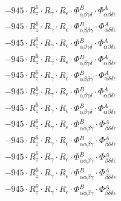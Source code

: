 \documentclass{article}
\begin{document}
\begin{subequations}
\begin{gather}
\begin{array}{c}
 \\[0.2em] 		 - 945 \cdot R_{z}^{6} \cdot R_{\gamma{}} \cdot R_{\epsilon{}} \cdot \Phi{}^{B}_{\alpha{}\beta{}\gamma{}\delta{}} \cdot \Phi{}^{A}_{\alpha{}\beta{}\delta{}\epsilon{}} 
 \\[0.2em] 		 - 945 \cdot R_{z}^{6} \cdot R_{\gamma{}} \cdot R_{\epsilon{}} \cdot \Phi{}^{B}_{\alpha{}\beta{}\beta{}\gamma{}} \cdot \Phi{}^{A}_{\alpha{}\delta{}\delta{}\epsilon{}} 
 \\[0.2em] 		 - 945 \cdot R_{z}^{6} \cdot R_{\gamma{}} \cdot R_{\epsilon{}} \cdot \Phi{}^{B}_{\alpha{}\beta{}\gamma{}\delta{}} \cdot \Phi{}^{A}_{\alpha{}\beta{}\delta{}\epsilon{}} 
 \\[0.2em] 		 - 945 \cdot R_{z}^{6} \cdot R_{\gamma{}} \cdot R_{\epsilon{}} \cdot \Phi{}^{B}_{\alpha{}\beta{}\gamma{}\delta{}} \cdot \Phi{}^{A}_{\alpha{}\beta{}\delta{}\epsilon{}} 
 \\[0.2em] 		 - 945 \cdot R_{z}^{6} \cdot R_{\gamma{}} \cdot R_{\epsilon{}} \cdot \Phi{}^{B}_{\alpha{}\beta{}\beta{}\gamma{}} \cdot \Phi{}^{A}_{\alpha{}\delta{}\delta{}\epsilon{}} 
 \\[0.2em] 		 - 945 \cdot R_{z}^{6} \cdot R_{\gamma{}} \cdot R_{\epsilon{}} \cdot \Phi{}^{B}_{\alpha{}\beta{}\gamma{}\delta{}} \cdot \Phi{}^{A}_{\alpha{}\beta{}\delta{}\epsilon{}} 
 \\[0.2em] 		 - 945 \cdot R_{z}^{6} \cdot R_{\gamma{}} \cdot R_{\epsilon{}} \cdot \Phi{}^{B}_{\alpha{}\beta{}\gamma{}\delta{}} \cdot \Phi{}^{A}_{\alpha{}\beta{}\delta{}\epsilon{}} 
 \\[0.2em] 		 - 945 \cdot R_{z}^{6} \cdot R_{\gamma{}} \cdot R_{\epsilon{}} \cdot \Phi{}^{B}_{\alpha{}\alpha{}\beta{}\gamma{}} \cdot \Phi{}^{A}_{\beta{}\delta{}\delta{}\epsilon{}} 
 \\[0.2em] 		 - 945 \cdot R_{z}^{6} \cdot R_{\gamma{}} \cdot R_{\epsilon{}} \cdot \Phi{}^{B}_{\alpha{}\alpha{}\beta{}\gamma{}} \cdot \Phi{}^{A}_{\beta{}\delta{}\delta{}\epsilon{}} 
 \\[0.2em] 		 - 945 \cdot R_{z}^{6} \cdot R_{\gamma{}} \cdot R_{\epsilon{}} \cdot \Phi{}^{B}_{\alpha{}\alpha{}\beta{}\gamma{}} \cdot \Phi{}^{A}_{\beta{}\delta{}\delta{}\epsilon{}} 
 \\[0.2em] 		 - 945 \cdot R_{z}^{6} \cdot R_{\gamma{}} \cdot R_{\epsilon{}} \cdot \Phi{}^{B}_{\alpha{}\alpha{}\beta{}\gamma{}} \cdot \Phi{}^{A}_{\beta{}\delta{}\delta{}\epsilon{}} 
 \\[0.2em] 		 - 945 \cdot R_{z}^{6} \cdot R_{\gamma{}} \cdot R_{\epsilon{}} \cdot \Phi{}^{B}_{\alpha{}\alpha{}\beta{}\gamma{}} \cdot \Phi{}^{A}_{\beta{}\delta{}\delta{}\epsilon{}} 

\end{array}
\end{gather}
\end{subequations}
\end{document}
